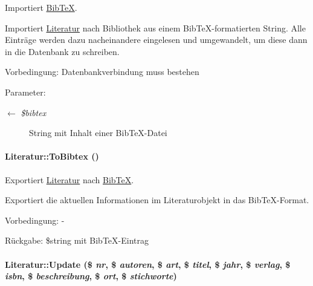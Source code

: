Importiert \hyperlink{classBibTeX}{Bib\-Te\-X}. 

Importiert \hyperlink{classLiteratur}{Literatur} nach Bibliothek aus einem Bib\-Te\-X-formatierten String. Alle Einträge werden dazu nacheinandere eingelesen und umgewandelt, um diese dann in die Datenbank zu schreiben. \begin{Desc}
\item[Vorbedingung:]Datenbankverbindung muss bestehen \end{Desc}
\begin{Desc}
\item[Parameter:]
\begin{description}
\item[\mbox{$\leftarrow$} {\em \$bibtex}]String mit Inhalt einer Bib\-Te\-X-Datei\end{description}
\end{Desc}
\hypertarget{classLiteratur_11f6d1a4409c41638ff6693f65699ff3}{
\paragraph[ToBibtex]{\setlength{\rightskip}{0pt plus 5cm}Literatur::To\-Bibtex ()}\hfill}
\label{classLiteratur_11f6d1a4409c41638ff6693f65699ff3}


Exportiert \hyperlink{classLiteratur}{Literatur} nach \hyperlink{classBibTeX}{Bib\-Te\-X}. 

Exportiert die aktuellen Informationen im Literaturobjekt in das Bib\-Te\-X-Format. \begin{Desc}
\item[Vorbedingung:]- \end{Desc}
\begin{Desc}
\item[R\"{u}ckgabe:]\$string mit Bib\-Te\-X-Eintrag \end{Desc}
\hypertarget{classLiteratur_b613c28476ea28058f8fc2bccb57c923}{
\paragraph[Update]{\setlength{\rightskip}{0pt plus 5cm}Literatur::Update (\$ {\em nr}, \$ {\em autoren}, \$ {\em art}, \$ {\em titel}, \$ {\em jahr}, \$ {\em verlag}, \$ {\em isbn}, \$ {\em beschreibung}, \$ {\em ort}, \$ {\em stichworte})}\hfill}
\label{classLiteratur_b613c28476ea28058f8fc2bccb57c923}


